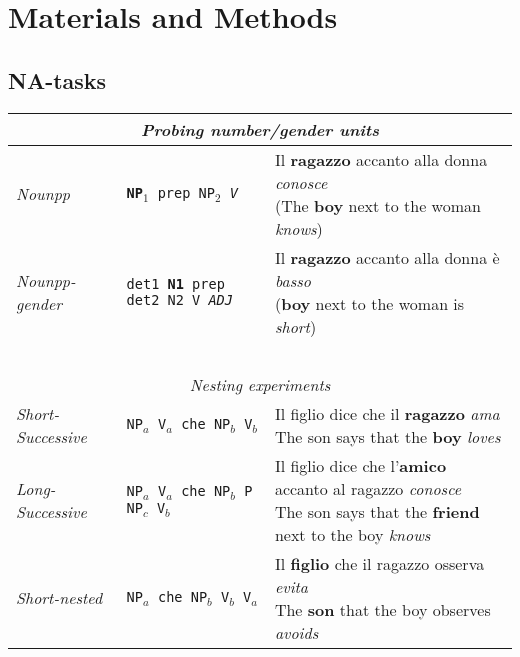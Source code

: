 \section{Materials and Methods}

\subsection{NA-tasks}

\begin{table}
    \setlength\tabcolsep{2mm}
\small
\centering
\begin{tabular}{lll}
\multicolumn{3}{c}{\centering \textit{Probing number/gender units}}\\
\hline
\hline
\emph{Nounpp} & \texttt{\textbf{NP$_1$} prep NP$_2$ \emph{V}} & \specialcell{Il \textbf{ragazzo} accanto alla donna \emph{conosce}\vspace{-3mm}\\({\scriptsize The \textbf{boy} next to the woman \emph{knows}})} \\
   \emph{Nounpp-gender} & \texttt{det1 \textbf{N1} prep det2 N2 V \emph{ADJ}} & \specialcell{Il \textbf{ragazzo} accanto alla donna \`{e} \emph{basso}\vspace{-3mm}\\({\scriptsize \textbf{boy} next to the woman is \emph{short}})}\\
~\\
\multicolumn{3}{c}{\centering \textit{Nesting experiments}}\\
\hline
\hline
\emph{Short-Successive} & \texttt{NP$_a$ V$_a$ che NP$_b$ V$_b$} & \specialcell{Il figlio dice che il \textbf{ragazzo} \emph{ama}\vspace{-3mm}\\{\scriptsize The son says that the \textbf{boy} \emph{loves}}} \\
\emph{Long-Successive} & \texttt{NP$_a$ V$_a$ che NP$_b$ P NP$_c$ V$_b$} & \specialcell{Il figlio dice che l'\textbf{amico} accanto al ragazzo \emph{conosce}\vspace{-3mm}\\{\scriptsize The son says that the \textbf{friend} next to the boy \emph{knows}}} \\
\emph{Short-nested} & \texttt{NP$_a$ che NP$_b$ V$_b$ V$_a$ } & \specialcell{Il \textbf{figlio} che il ragazzo osserva \emph{evita}\vspace{-3mm}\\{\scriptsize The \textbf{son} that the boy observes \emph{avoids}}} \\

\end{tabular}
\end{table}
